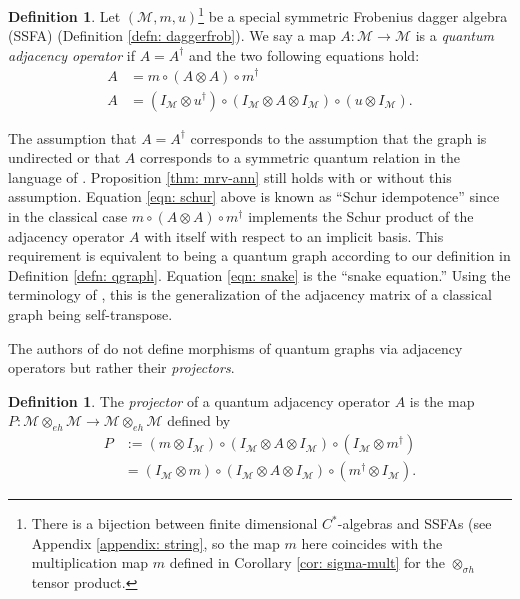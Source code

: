 \documentclass[12pt]{article}
\theoremstyle{definition}
\newtheorem{definition}[theorem]{Definition}
\newenvironment{remark}
  {\pushQED{\qed}\renewcommand{\qedsymbol}{\textcircled{\tiny R}}\remarkx}
  {\popQED\endremarkx}
\newcommand{\mc}[1]{\mathcal{#1}}
\newcommand{\<}{\langle}
\renewcommand{\>}{\rangle}
\begin{document}
\begin{definition}  
    Let $(\mc M, m, u)$\footnote{There is a bijection between finite dimensional $C^*$-algebras and SSFAs (see Appendix \ref{appendix: string}, so the map $m$ here coincides with the multiplication map $m$ defined in Corollary \ref{cor: sigma-mult} for the $\otimes_{\sigma h}$ tensor product.} be a special symmetric Frobenius dagger algebra (SSFA) (Definition \ref{defn: daggerfrob}). We say a map $A: \mc M \to \mc M$ is a \textit{quantum adjacency operator} if $A= A^\dagger$ and the two following equations hold:
    \begin{align}
    A &= m \circ (A \otimes A) \circ m^\dagger \label{eqn: schur} \\
    A &= (I_{\mc M} \otimes u^\dagger) \circ (I_{\mc M} \otimes A \otimes I_{\mc M})\circ (u \otimes I_{\mc M}) \label{eqn: snake}.
    \end{align}
\end{definition}

\begin{remark}
The assumption that $A = A^\dagger$ corresponds to the assumption that the graph is undirected \cite[Proposition 2.6]{daws} or that $A$ corresponds to a symmetric quantum relation in the language of \cite[Definition 2.4]{weaverqrelations}. Proposition \ref{thm: mrv-ann} still holds with or without this assumption. Equation \ref{eqn: schur} above is known as ``Schur idempotence'' since in the classical case $m \circ (A \otimes A) \circ m^\dagger$ implements the Schur product of the adjacency operator $A$ with itself with respect to an implicit basis. This requirement is equivalent to being a quantum graph according to our definition in Definition \ref{defn: qgraph}. Equation \ref{eqn: snake} is the ``snake equation.'' Using the terminology of \cite[Definition 2.4]{daws}, this is the generalization of the adjacency matrix of a classical graph being self-transpose.
\end{remark}

The authors of \cite{musto-reutter-verdon} do not define morphisms of quantum graphs via adjacency operators but rather their \textit{projectors}.

\begin{definition}  \label{defn: projector}
    The \textit{projector} of a quantum adjacency operator $A$ is the map $P :\mc M \otimes_{eh} \mc M \to \mc M \otimes_{eh} \mc M$ defined by
    \begin{align*}
    P &:= (m \otimes I_{\mc M})\circ (I_{\mc M} \otimes A \otimes I_{\mc M})\circ (I_{\mc M} \otimes m^\dagger) \\
    &= (I_{\mc M} \otimes m)\circ (I_{\mc M} \otimes A \otimes I_{\mc M})\circ (m^\dagger \otimes I_{\mc M}).
    \end{align*}
\end{definition}
\end{document}
